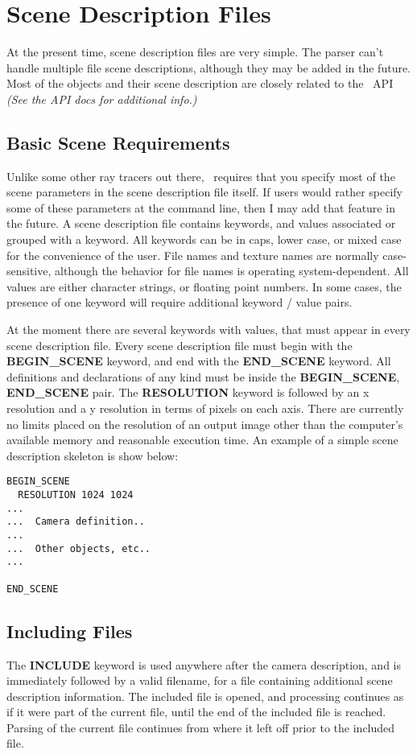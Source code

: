 \section{Scene Description Files}
  At the present time, scene description files are very simple.  
The parser can't handle multiple file scene descriptions, although they
may be added in the future.  Most of the objects and their scene description
are closely related to the \RAY\ API 
{\em (See the API docs for additional info.)}

\subsection{Basic Scene Requirements}
  Unlike some other ray tracers out there, \RAY\ requires that you 
specify most of the scene parameters in the scene description file itself.
If users would rather specify some of these parameters at the command line,
then I may add that feature in the future.  
A scene description file contains keywords, and values associated or grouped
with a keyword.  All keywords can be in caps, lower case, or mixed case
for the convenience of the user.  File names and texture names are 
normally case-sensitive, although the behavior for file names is 
operating system-dependent.  All values are either character strings, or
floating point numbers.  In some cases, the presence of one keyword will
require additional keyword / value pairs. 

  At the moment there are several keywords with values, 
that must appear in every scene description file.  
Every scene description file must begin with the 
{\bf BEGIN\_SCENE} keyword, and end with the {\bf END\_SCENE} keyword.
All definitions and declarations of any kind must be inside the 
{\bf BEGIN\_SCENE}, {\bf END\_SCENE} pair.
The {\bf RESOLUTION} keyword is followed by an x resolution
and a y resolution in terms of pixels on each axis.  There are currently 
no limits placed on the resolution of an output image other than the
computer's available memory and reasonable execution time.
An example of a simple scene description skeleton is show below:
\begin{verbatim}
BEGIN_SCENE
  RESOLUTION 1024 1024 
...
...  Camera definition..
...
...  Other objects, etc..
...

END_SCENE
\end{verbatim}



\subsection{Including Files}
The {\bf INCLUDE} keyword is used anywhere after the camera description,
and is immediately followed by a valid filename, for a file containing
additional scene description information.  The included file is opened,
and processing continues as if it were part of the current file, until
the end of the included file is reached.  Parsing of the current file
continues from where it left off prior to the included file.  

